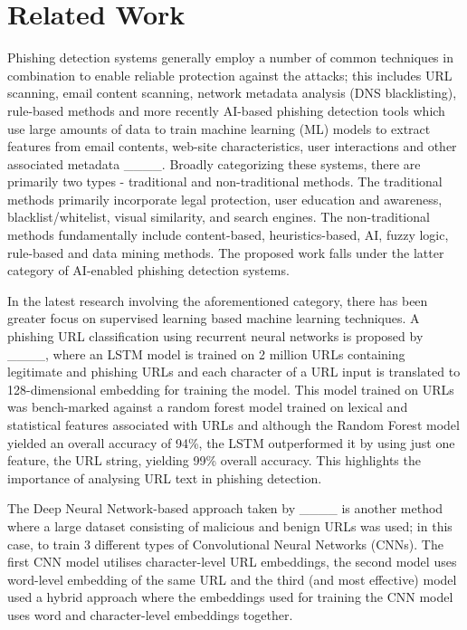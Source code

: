 \section{Related Work \label{related}
}

Phishing detection systems generally employ a number of common techniques in combination to enable reliable protection against the attacks; this includes URL scanning, email content scanning, network metadata analysis (DNS blacklisting), rule-based methods and more recently AI-based phishing detection tools which use large amounts of data to train machine learning (ML) models to extract features from email contents, web-site characteristics, user interactions and other associated metadata ____. Broadly categorizing these systems, there are primarily two types - traditional and non-traditional methods. The traditional methods primarily incorporate legal protection, user education and awareness, blacklist/whitelist, visual similarity, and search engines. The non-traditional methods fundamentally include content-based, heuristics-based, AI, fuzzy logic, rule-based and data mining methods. The proposed work falls under the latter category of AI-enabled phishing detection systems.

In the latest research involving the aforementioned category, there has been greater focus on supervised learning based machine learning techniques. A phishing URL classification using recurrent neural networks is proposed by ____, where an LSTM model is trained on 2 million URLs containing legitimate and phishing URLs and each character of a URL input is translated to 128-dimensional embedding for training the model. This model trained on URLs was bench-marked against a random forest model trained on lexical and statistical features associated with URLs and although the Random Forest model yielded an overall accuracy of 94\%, the LSTM outperformed it by using just one feature, the URL string, yielding 99\% overall accuracy. This highlights the importance of analysing URL text in phishing detection.

The Deep Neural Network-based approach taken by ____ is another method where a large dataset consisting of malicious and benign URLs was used; in this case, to train 3 different types of Convolutional Neural Networks (CNNs). The first CNN model utilises character-level URL embeddings, the second model uses word-level embedding of the same URL and the third (and most effective) model used a hybrid approach where the embeddings used for training the CNN model uses word and character-level embeddings together.

